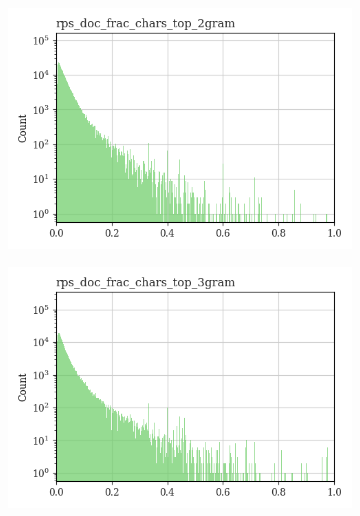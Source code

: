 \documentclass{article}
\begin{document}
\begin{figure}
     \centering
     \begin{subfigure}[b]{0.32\textwidth}
         \centering
         \includegraphics[width=\textwidth]{figures/quality_signals/rps_doc_frac_chars_top_2gram.png}
     \end{subfigure}
     \hfill
     \begin{subfigure}[b]{0.32\textwidth}
         \centering
         \includegraphics[width=\textwidth]{figures/quality_signals/rps_doc_frac_chars_top_3gram.png}
     \end{subfigure}
     \hfill
     \begin{subfigure}[b]{0.32\textwidth}
         \centering

\end{subfigure}
\end{figure}
\end{document}
